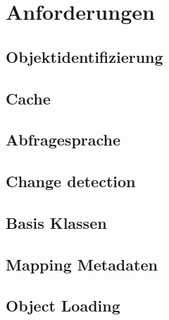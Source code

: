 \chapter{Anforderungen}

\section{Objektidentifizierung}


\section{Cache}
\section{Abfragesprache}
\section{Change detection}
\section{Basis Klassen}
\section{Mapping Metadaten}
\section{Object Loading}
